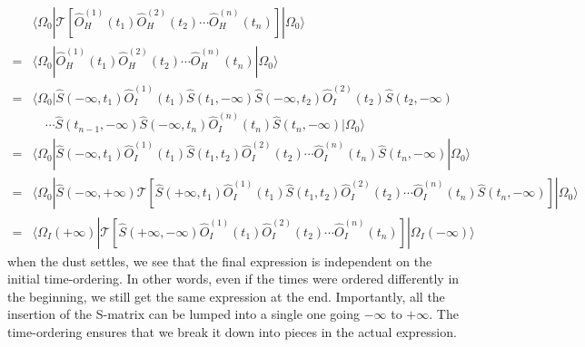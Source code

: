 \begin{align*}
    &\langle \Omega _0|\mathcal{T} \left[ \hat{O}_{H}^{\left( 1 \right)}\left( t_1 \right) \hat{O}_{H}^{\left( 2 \right)}\left( t_2 \right) \cdots \hat{O}_{H}^{\left( n \right)}\left( t_n \right) \right] |\Omega _0\rangle \\
    =&\langle \Omega _0|\hat{O}_{H}^{\left( 1 \right)}\left( t_1 \right) \hat{O}_{H}^{\left( 2 \right)}\left( t_2 \right) \cdots \hat{O}_{H}^{\left( n \right)}\left( t_n \right) |\Omega _0\rangle \\
    =&\langle \Omega _0|\hat{S}\left( -\infty ,t_1 \right) \hat{O}_{I}^{\left( 1 \right)}\left( t_1 \right) \hat{S}\left( t_1,-\infty \right) \hat{S}\left( -\infty ,t_2 \right) \hat{O}_{I}^{\left( 2 \right)}\left( t_2 \right) \hat{S}\left( t_2,-\infty \right) \\
    &\quad \cdots \hat{S}\left( t_{n-1},-\infty \right) \hat{S}\left( -\infty ,t_n \right) \hat{O}_{I}^{\left( n \right)}\left( t_n \right) \hat{S}\left( t_n,-\infty \right) |\Omega _0\rangle \\
    =&\langle \Omega _0|\hat{S}\left( -\infty ,t_1 \right) \hat{O}_{I}^{\left( 1 \right)}\left( t_1 \right) \hat{S}\left( t_1,t_2 \right) \hat{O}_{I}^{\left( 2 \right)}\left( t_2 \right) \cdots \hat{O}_{I}^{\left( n \right)}\left( t_n \right) \hat{S}\left( t_n,-\infty \right) |\Omega _0\rangle \\
    =&\langle \Omega _0|\hat{S}\left( -\infty ,+\infty \right) \mathcal{T} \left[ \hat{S}\left( +\infty ,t_1 \right) \hat{O}_{I}^{\left( 1 \right)}\left( t_1 \right) \hat{S}\left( t_1,t_2 \right) \hat{O}_{I}^{\left( 2 \right)}\left( t_2 \right) \cdots \hat{O}_{I}^{\left( n \right)}\left( t_n \right) \hat{S}\left( t_n,-\infty \right) \right] |\Omega _0\rangle \\
    =&\langle \Omega _I\left( +\infty \right) |\mathcal{T} \left[ \hat{S}\left( +\infty ,-\infty \right) \hat{O}_{I}^{\left( 1 \right)}\left( t_1 \right) \hat{O}_{I}^{\left( 2 \right)}\left( t_2 \right) \cdots \hat{O}_{I}^{\left( n \right)}\left( t_n \right) \right] |\Omega _I\left( -\infty \right) \rangle
\end{align*}
when the dust settles, we see that the final expression is independent on the initial time-ordering. In other words, even if the times were ordered differently in the beginning, we still get the same expression at the end. Importantly, all the insertion of the S-matrix can be lumped into a single one going $-\infty$ to $+\infty$. The time-ordering ensures that we break it down into pieces in the actual expression.

